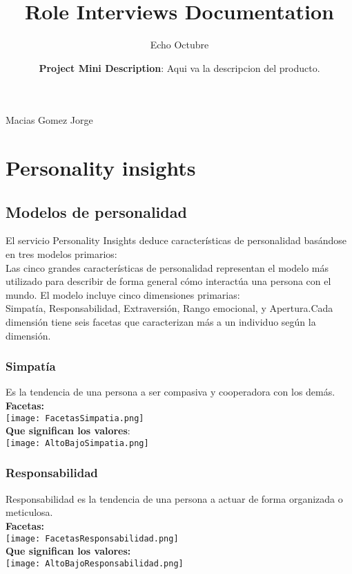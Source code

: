 \documentclass[10pt]{article}
\title {Role Interviews Documentation}
\author{Echo Octubre \\
}
\date{{\bf Project Mini Description}: Aqui va la descripcion del producto.}
\begin{document}
\maketitle
Macias Gomez Jorge 

\section{Personality insights}
    \subsection{Modelos de personalidad}
        El servicio Personality Insights deduce características de personalidad basándose en tres modelos primarios:\\
        Las cinco grandes características de personalidad representan el modelo más utilizado para describir de forma general cómo interactúa una persona con el mundo. El modelo incluye cinco dimensiones primarias: \\
        Simpatía, Responsabilidad, Extraversión, Rango emocional, y Apertura.Cada dimensión tiene seis facetas que caracterizan más a un individuo según la dimensión.\\
    
        \subsubsection{Simpatía}
                Es la tendencia de una persona a ser compasiva y cooperadora con los demás.\\                \textbf{Facetas:} \\
                \texttt{[image: FacetasSimpatia.png]}\\
               \textbf{ Que significan los valores}:\\ 
                \texttt{[image: AltoBajoSimpatia.png]}\\
                
        \subsubsection{Responsabilidad}
                Responsabilidad es la tendencia de una persona a actuar de forma organizada o meticulosa.\\                
                \textbf{Facetas:}\\
                \texttt{[image: FacetasResponsabilidad.png]}\\
                \textbf{Que significan los valores:}\\ 
                \texttt{[image: AltoBajoResponsabilidad.png]}\\
                
\end{document}
